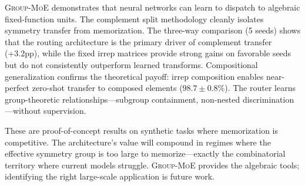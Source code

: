 \documentclass[10pt, letterpaper]{article}
\newcommand{\gmoe}{\textsc{Group-MoE}}
\begin{document}
\gmoe{} demonstrates that neural networks can learn to dispatch to algebraic fixed-function units. The complement split methodology cleanly isolates symmetry transfer from memorization. The three-way comparison (5 seeds) shows that the routing architecture is the primary driver of complement transfer (+3.2pp), while the fixed irrep matrices provide strong gains on favorable seeds but do not consistently outperform learned transforms. Compositional generalization confirms the theoretical payoff: irrep composition enables near-perfect zero-shot transfer to composed elements ($98.7 \pm 0.8$\%). The router learns group-theoretic relationships---subgroup containment, non-nested discrimination---without supervision.

These are proof-of-concept results on synthetic tasks where memorization is competitive. The architecture's value will compound in regimes where the effective symmetry group is too large to memorize---exactly the combinatorial territory where current models struggle. \gmoe{} provides the algebraic tools; identifying the right large-scale application is future work.
\end{document}
